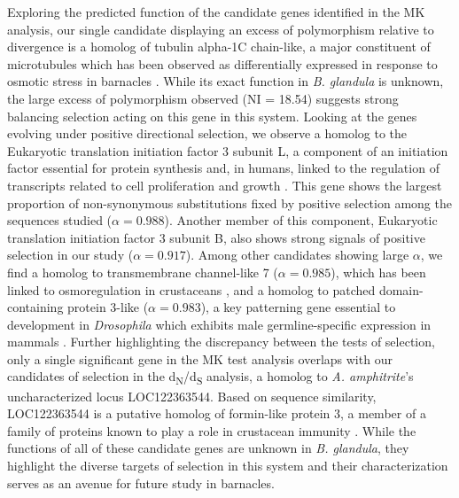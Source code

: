 \documentclass[11pt]{article}
\newcommand{\dnds}{d\textsubscript{N}/d\textsubscript{S}\xspace}
\newcommand{\bgla}{\textit{B. glandula}\xspace}
\begin{document}
Exploring the predicted function of the candidate genes identified in the MK analysis,
our single candidate displaying an excess of polymorphism relative to divergence is a
homolog of tubulin alpha-1C chain-like, a major constituent of microtubules
which has been observed as differentially expressed in response to osmotic stress in
barnacles \citep{chandramouli_transcriptome_2015}.
While its exact function in \bgla{} is unknown, the large excess of polymorphism
observed (NI = 18.54) suggests strong balancing selection acting on this gene in
this system.
Looking at the genes evolving under positive directional selection, we observe a homolog
to the Eukaryotic translation initiation factor 3 subunit L, a component of an initiation
factor essential for protein synthesis and, in humans, linked to the regulation of
transcripts related to cell proliferation and growth \citep{lee_eif3_2015}.
This gene shows the largest proportion of non-synonymous substitutions fixed by
positive selection among the sequences studied ($\alpha = 0.988$).
Another member of this component, Eukaryotic translation initiation factor 3 subunit B,
also shows strong signals of positive selection in our study ($\alpha = 0.917$).
Among other candidates showing large $\alpha$, we find a homolog to transmembrane channel-like 7
($\alpha = 0.985$), which has been linked to osmoregulation in crustaceans
\citep{liu_osmoregulatory_2025}, and a homolog to patched domain-containing protein 3-like
($\alpha = 0.983$), a key patterning gene essential to development in \textit{Drosophila}
\citep{bolatto_spatial_2015} which exhibits male germline-specific expression in mammals
\citep{fan_male_2007}.
Further highlighting the discrepancy between the tests of selection, only a single
significant gene in the MK test analysis overlaps with our candidates of selection in
the \dnds{} analysis, a homolog to \textit{A. amphitrite}'s uncharacterized locus
LOC122363544.
Based on sequence similarity, LOC122363544 is a putative homolog of formin-like protein 3,
a member of a family of proteins known to play a role in crustacean immunity
\citep{li_formin-like_2025}.
While the functions of all of these candidate genes are unknown in \bgla{}, they highlight
the diverse targets of selection in this system and their characterization serves as
an avenue for future study in barnacles.
\end{document}
